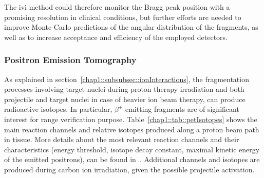 The \gls{ivi} method could therefore monitor the Bragg peak position with a promising resolution in clinical conditions, but further efforts are needed to improve Monte Carlo predictions of the angular distribution of the fragments, as well as to increase acceptance and efficiency of the employed detectors. 
    
\subsubsection{Positron Emission Tomography}\label{chap1::subsubsec::RangePET}
As explained in section~\ref{chap1::subsubsec::ionInteractions}, the fragmentation processes involving target nuclei during proton therapy irradiation and both projectile and target nuclei in case of heavier ion beam therapy, can produce radioactive isotopes. In particular, $\beta^+$ emitting fragments are of significant interest for range verification purpose. Table~\ref{chap1::tab::petIsotopes} shows the main reaction channels and relative isotopes produced along a proton beam path in tissue. More details about the most relevant reaction channels and their characteristics (energy threshold, isotope decay constant, maximal kinetic energy of the emitted positrons), can be found in~\cite{Oelfke1996}. Additional channels and isotopes are produced during carbon ion irradiation, given the possible projectile activation. 

\begin{table}[!htbp]
\centering
\caption{Proton-nuclear reaction channels and relative positron emitters produced in human tissues. Table reproduced from~\cite{Espana2011b}.}
\label{chap1::tab::petIsotopes}
\end{table}    

